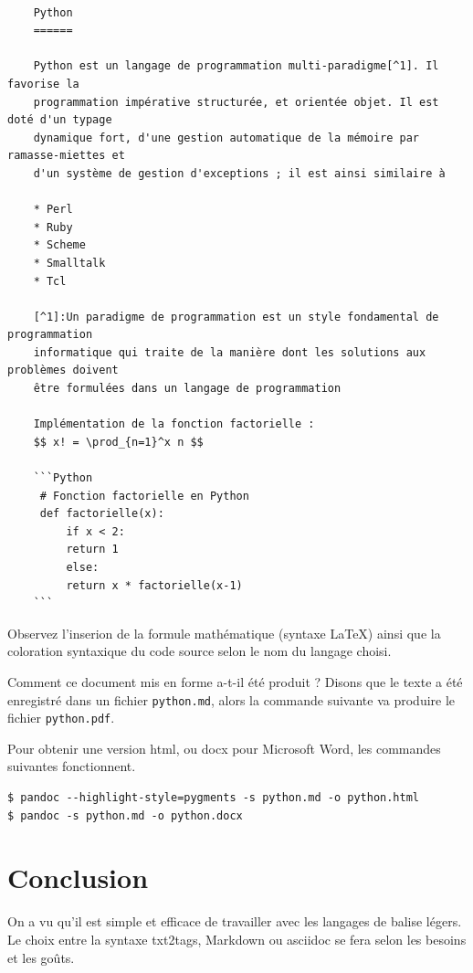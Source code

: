 \documentclass[12pt]{article}
\newenvironment{Shaded}{}{}
\newcommand{\NormalTok}[1]{{#1}}
\begin{document}
\begin{verbatim}

    Python
    ======

    Python est un langage de programmation multi-paradigme[^1]. Il favorise la
    programmation impérative structurée, et orientée objet. Il est doté d'un typage
    dynamique fort, d'une gestion automatique de la mémoire par ramasse-miettes et
    d'un système de gestion d'exceptions ; il est ainsi similaire à 

    * Perl
    * Ruby
    * Scheme
    * Smalltalk
    * Tcl

    [^1]:Un paradigme de programmation est un style fondamental de programmation
    informatique qui traite de la manière dont les solutions aux problèmes doivent
    être formulées dans un langage de programmation

    Implémentation de la fonction factorielle :
    $$ x! = \prod_{n=1}^x n $$

    ```Python
     # Fonction factorielle en Python
     def factorielle(x):
         if x < 2:
         return 1
         else:
         return x * factorielle(x-1)
    ```
\end{verbatim}
Observez l'inserion de la formule mathématique (syntaxe LaTeX) ainsi que
la coloration syntaxique du code source selon le nom du langage choisi.

Comment ce document mis en forme a-t-il été produit ? Disons que le
texte a été enregistré dans un fichier \texttt{python.md}, alors la
commande suivante va produire le fichier \texttt{python.pdf}.

\begin{Shaded}
\end{Shaded}
Pour obtenir une version html, ou docx pour Microsoft Word, les
commandes suivantes fonctionnent.

\begin{verbatim}
$ pandoc --highlight-style=pygments -s python.md -o python.html
$ pandoc -s python.md -o python.docx
\end{verbatim}
\section{Conclusion}

On a vu qu'il est simple et efficace de travailler avec les langages de
balise légers. Le choix entre la syntaxe txt2tags, Markdown ou asciidoc
se fera selon les besoins et les goûts.
\end{document}
